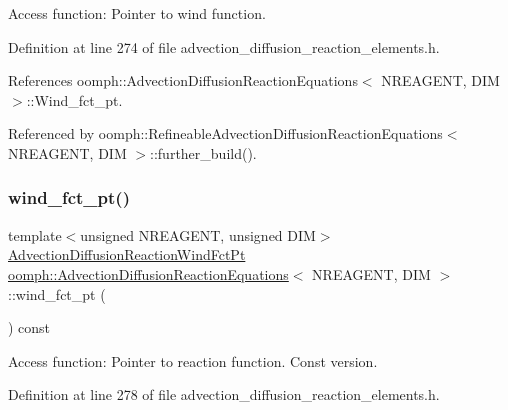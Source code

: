 Access function\+: Pointer to wind function. 



Definition at line 274 of file advection\+\_\+diffusion\+\_\+reaction\+\_\+elements.\+h.



References oomph\+::\+Advection\+Diffusion\+Reaction\+Equations$<$ N\+R\+E\+A\+G\+E\+N\+T, D\+I\+M $>$\+::\+Wind\+\_\+fct\+\_\+pt.



Referenced by oomph\+::\+Refineable\+Advection\+Diffusion\+Reaction\+Equations$<$ N\+R\+E\+A\+G\+E\+N\+T, D\+I\+M $>$\+::further\+\_\+build().

\mbox{\label{classoomph_1_1AdvectionDiffusionReactionEquations_a17fba6f4ed57ff9908e4fb3d55aaf5c9}} 
\subsubsection{\texorpdfstring{wind\+\_\+fct\+\_\+pt()}{wind\_fct\_pt()}\hspace{0.1cm}{\footnotesize\ttfamily [2/2]}}
{\footnotesize\ttfamily template$<$unsigned N\+R\+E\+A\+G\+E\+NT, unsigned D\+IM$>$ \\
\hyperlink{classoomph_1_1AdvectionDiffusionReactionEquations_a2fff621b5b44c64bd5b3f0412201055f}{Advection\+Diffusion\+Reaction\+Wind\+Fct\+Pt} \hyperlink{classoomph_1_1AdvectionDiffusionReactionEquations}{oomph\+::\+Advection\+Diffusion\+Reaction\+Equations}$<$ N\+R\+E\+A\+G\+E\+NT, D\+IM $>$\+::wind\+\_\+fct\+\_\+pt (\begin{DoxyParamCaption}{ }\end{DoxyParamCaption}) const\hspace{0.3cm}{\ttfamily [inline]}}



Access function\+: Pointer to reaction function. Const version. 



Definition at line 278 of file advection\+\_\+diffusion\+\_\+reaction\+\_\+elements.\+h.



